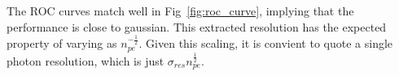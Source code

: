 The ROC curves match well in Fig~\ref{fig:roc_curve}, implying that the performance is close to gaussian.  This extracted resolution has the expected property of varying as ${n_{pe}^{-\frac{1}{2}}}$.  Given this scaling, it is convient to quote a single photon resolution, which is just $\sigma_{res}{n_{pe}^{\frac{1}{2}}}$.
